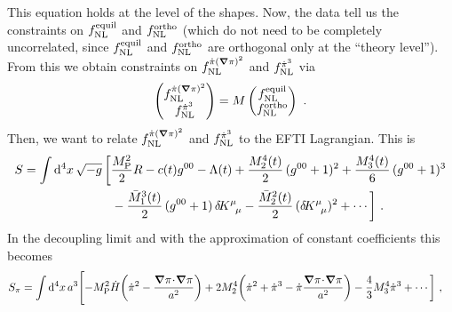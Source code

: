 \documentclass[aps,prd,amsmath,floats,floatfix,superscriptaddress,nofootinbib%
]{revtex4}%
\newcommand{\hp}{\hphantom}
\renewcommand\({\left(}
\renewcommand\){\right)}
\renewcommand\[{\left[}
\renewcommand\]{\right]}
\renewcommand{\vec}{\bm}
\def\mpl{M_{\rm P}}
\newcommand{\dif}{\mathrm{d}}
\begin{document}
This equation holds at the level of the shapes. Now, the data tell us the constraints on $f_{\rm NL}^{\rm equil}$ and $f_{\rm NL}^{\rm ortho}$ 
(which do not need to be completely uncorrelated, since $f_{\rm NL}^{\rm equil}$ and $f_{\rm NL}^{\rm ortho}$ are orthogonal only at the ``theory level''). 
From this we obtain constraints on $f_{\rm NL}^{\dot{\pi}(\vec{\nabla}\pi)^2}$ and $f_{\rm NL}^{\dot{\pi}^3}$ via 
\begin{equation}
\begin{pmatrix}
f_{\rm NL}^{\dot{\pi}(\vec{\nabla}\pi)^2} \\
f_{\rm NL}^{\dot{\pi}^3}
\end{pmatrix} 
= M
\begin{pmatrix}
f_{\rm NL}^{\rm equil} \\
f_{\rm NL}^{\rm ortho}
\end{pmatrix}
\,\,. 
\end{equation} 
Then, we want to relate $f_{\rm NL}^{\dot{\pi}(\vec{\nabla}\pi)^2}$ and $f_{\rm NL}^{\dot{\pi}^3}$ to the EFTI Lagrangian. This is 
\begin{equation}
\begin{split} 
S &= \int\dif^4x\,\sqrt{-g}\,\bigg[\frac{\mpl^2}{2}R - c(t)g^{00} - \Lambda(t) + \frac{M_2^4(t)}{2}\,(g^{00}+1)^2 + \frac{M_3^4(t)}{6}\,(g^{00}+1)^3 \\ 
&\hp{= \int\dif^4x\,\sqrt{-g}\,\bigg[}\,\, - \frac{\bar{M}^3_1(t)}{2}\,(g^{00}+1)\,\delta\!K^\mu_{\hp{\mu}\mu} 
- \frac{\bar{M}^2_2(t)}{2}\,(\delta\!K^\mu_{\hp{\mu}\mu})^2 + \cdots\bigg]\,\,. 
\end{split} 
\end{equation} 
In the decoupling limit and with the approximation of constant coefficients this becomes 
\begin{equation}
\begin{split}
S_\pi &= \int\dif^4x\,a^3\Bigg[{-\mpl^2}\dot{H}\bigg(\dot{\pi}^2 - \frac{\vec{\nabla}\pi\!\cdot\! 
\vec{\nabla}\pi}{a^2}\bigg) + 2M^4_2\bigg(\dot{\pi}^2 + \dot{\pi}^3 - \dot{\pi}\frac{\vec{\nabla}\pi\!\cdot\! 
\vec{\nabla}\pi}{a^2}\bigg) - \frac{4}{3}M^4_3\dot{\pi}^3 + \cdots\bigg] %
\,\,, 
\end{split}
\end{equation} 
\end{document}
